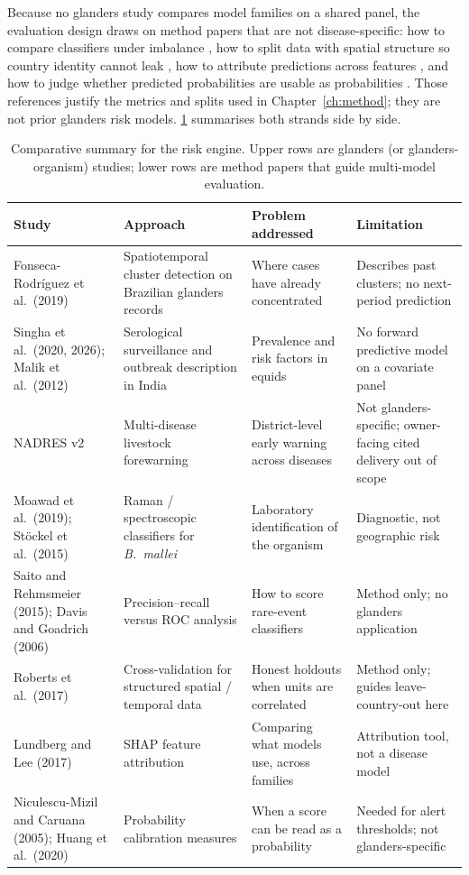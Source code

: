 \documentclass[10pt,openany]{report}
\begin{document}
Because no glanders study compares model families on a shared panel, the evaluation design draws on
method papers that are not disease-specific: how to compare classifiers under imbalance
\cite{saito2015,davis2006}, how to split data with spatial structure so country identity cannot leak
\cite{roberts2017}, how to attribute predictions across features \cite{lundberg2017}, and how to
judge whether predicted probabilities are usable as probabilities \cite{niculescu2005,huang2020}.
Those references justify the metrics and splits used in Chapter~\ref{ch:method}; they are not prior
glanders risk models. \cref{tab:ml-compare} summarises both strands side by side.

\begin{table}[htbp]
\centering
\caption[Comparative summary for the risk engine]{Comparative summary for the risk engine. Upper rows are glanders (or glanders-organism)
studies; lower rows are method papers that guide multi-model evaluation.}
\label{tab:ml-compare}
\small
\begin{tabular}{@{}>{\raggedright\arraybackslash}p{2.55cm}
                >{\raggedright\arraybackslash}p{3.35cm}
                >{\raggedright\arraybackslash}p{3.15cm}
                >{\raggedright\arraybackslash}p{3.55cm}@{}}
\toprule
\textbf{Study} & \textbf{Approach} & \textbf{Problem addressed} & \textbf{Limitation} \\
\midrule
Fonseca-Rodr\'iguez et al.\ (2019) &
Spatiotemporal cluster detection on Brazilian glanders records &
Where cases have already concentrated &
Describes past clusters; no next-period prediction \\
Singha et al.\ (2020, 2026); Malik et al.\ (2012) &
Serological surveillance and outbreak description in India &
Prevalence and risk factors in equids &
No forward predictive model on a covariate panel \\
NADRES v2 \cite{nadres} &
Multi-disease livestock forewarning &
District-level early warning across diseases &
Not glanders-specific; owner-facing cited delivery out of scope \\
Moawad et al.\ (2019); St\"ockel et al.\ (2015) &
Raman / spectroscopic classifiers for \textit{B.\ mallei} &
Laboratory identification of the organism &
Diagnostic, not geographic risk \\
\midrule
Saito and Rehmsmeier (2015); Davis and Goadrich (2006) &
Precision--recall versus ROC analysis &
How to score rare-event classifiers &
Method only; no glanders application \\
Roberts et al.\ (2017) &
Cross-validation for structured spatial / temporal data &
Honest holdouts when units are correlated &
Method only; guides leave-country-out here \\
Lundberg and Lee (2017) &
SHAP feature attribution &
Comparing what models use, across families &
Attribution tool, not a disease model \\
Niculescu-Mizil and Caruana (2005); Huang et al.\ (2020) &
Probability calibration measures &
When a score can be read as a probability &
Needed for alert thresholds; not glanders-specific \\
\bottomrule
\end{tabular}
\end{table}
\end{document}

